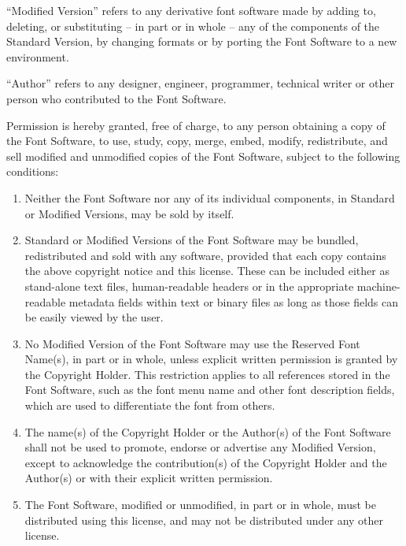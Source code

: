 \documentclass{fontdokuold}
\begin{document}
"`Modified Version"'  refers to any derivative font software made by
adding to, deleting, or substituting -- in part or in whole --
any of the components of the Standard Version, by changing formats
or by porting the Font Software to a new environment.

"`Author"' refers to any designer, engineer, programmer, technical
writer or other person who contributed to the Font Software.


Permission is hereby granted, free of charge, to any person obtaining
a copy of the Font Software, to use, study, copy, merge, embed, modify,
redistribute, and sell modified and unmodified copies of the Font
Software, subject to the following conditions:

\begin{enumerate}
\item Neither the Font Software nor any of its individual components,
      in Standard or Modified Versions, may be sold by itself.
\item Standard or Modified Versions of the Font Software may be bundled,
      redistributed and sold with any software, provided that each copy
      contains the above copyright notice and this license. These can be
      included either as stand-alone text files, human-readable headers or
      in the appropriate machine-readable metadata fields within text or
      binary files as long as those fields can be easily viewed by the user.
\item No Modified Version of the Font Software may use the Reserved Font
      Name(s), in part or in whole, unless explicit written permission is
      granted by the Copyright Holder. This restriction applies to all
      references stored in the Font Software, such as the font menu name and
      other font description fields, which are used to differentiate the
      font from others.
\item The name(s) of the Copyright Holder or the Author(s) of the Font
      Software shall not be used to promote, endorse or advertise any
      Modified Version, except to acknowledge the contribution(s) of the
      Copyright Holder and the Author(s) or with their explicit written
      permission.
\item The Font Software, modified or unmodified, in part or in whole,
      must be distributed using this license, and may not be distributed
      under any other license.
\end{enumerate}
\end{document}
